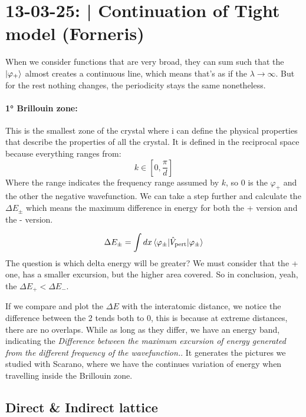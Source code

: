 \section{13-03-25: | Continuation of Tight model (Forneris)}

When we consider functions that are very broad, they can sum such that the $\ket{\varphi_+}$ almost creates a continuous line, which means that's as if the $\lambda \rightarrow \infty$. But for the rest nothing changes, the periodicity stays the same nonetheless.

\paragraph{1° Brillouin zone:} This is the smallest zone of the crystal where i can define the physical properties that describe the properties of all the crystal. It is defined in the reciprocal space because everything ranges from:
\begin{equation}
    k \in \left[0, \frac{\pi}{d}\right]
\end{equation}
Where the range indicates the frequency range assumed by $k$, so 0 is the $\varphi_+$ and the other the negative wavefunction.
We can take a step further and calculate the $\Delta E_{\pm}$ which means the maximum difference in energy for both the + version and the - version.

\begin{equation}
    \Delta E_{\pm} = \int dx \braket{\varphi_{\pm}|\hat{V}_{\text{pert}}|\varphi_{\pm}}
\end{equation}
The question is which delta energy will be greater? We must consider that the + one, has a smaller excursion, but the higher area covered. So in conclusion, yeah, the $\Delta E_+ < \Delta E_-$. 

If we compare and plot the $\Delta E$ with the interatomic distance, we notice the difference between the 2 tends both to 0, this is because at extreme distances, there are no overlaps. While as long as they differ, we have an energy band, indicating the \textit{Difference between the maximum excursion of energy generated from the different frequency of the wavefunction.}. It generates the pictures we studied with Scarano, where we have the continues variation of energy when travelling inside the Brillouin zone.

\subsection{Direct \& Indirect lattice}

